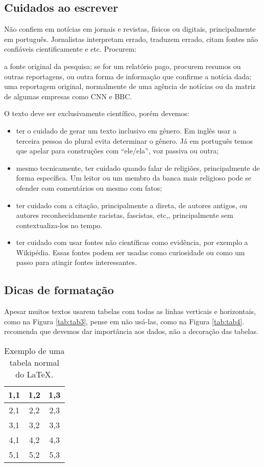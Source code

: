 \documentclass{article}
\begin{document}
\begin{outline}
\subsection{Cuidados ao escrever}

Não confiem em notícias em jornais e revistas, físicos ou digitais, principalmente em português. Jornalistas interpretam errado, traduzem errado, citam fontes não confiáveis cientificamente e etc.
Procurem:
\begin{outline}
    \1 a fonte original da pesquisa;
    \2 se for um relatório pago, procurem resumos ou outras reportagens, ou outra forma de informação que confirme a notícia dada;
    \1 uma reportagem original, normalmente de uma agência de notícias ou da matriz de algumas empresas como CNN e BBC.
\end{outline}

O texto deve ser exclusivamente científico, porém devemos:
\begin{itemize}
    \item ter o cuidado de gerar um texto inclusivo em gênero. Em inglês usar a terceira pessoa do plural evita determinar o gênero. Já em português temos que apelar para construções com ``ele/ela'', voz passiva ou outra;
    \item mesmo tecnicamente, ter cuidado quando falar de religiões, principalmente de forma específica. Um leitor ou um membro da banca mais religioso pode se ofender com comentários ou mesmo com fatos;
    \item ter cuidado com a citação, principalmente a direta, de autores antigos, ou autores reconhecidamente racistas, fascistas, etc,, principalmente sem contextualiza-los no tempo.
    \item ter cuidado com usar fontes não científicas como evidência, por exemplo a Wikipédia. Essas fontes podem ser usadas como curiosidade ou como um passo para atingir fontes interessantes. 
\end{itemize}


\subsection{Dicas de formatação}

Apesar muitos textos usarem tabelas com todas as linhas verticais e horizontais, como na Figura \ref{tab:tab3}, pense em não usá-las, como na Figura \ref{tab:tab4}. \citeauthor{ei} recomenda que devemos dar importância aos dados, não a decoração das tabelas.


\begin{table}[htb]
    \centering
        \caption{Exemplo de uma tabela normal do \LaTeX .}
    \begin{tabular}{|c|c|c|}
    \hline
        1,1 & 1,2 & 1,3   \\
        \hline
        2,1 & 2,2 & 2,3\\
        \hline
        3,1 & 3,2 & 3,3\\
        \hline
        4,1 & 4,2 & 4,3\\
        \hline
        5,1 & 5,2 & 5,3\\
        \hline
    \end{tabular}


\end{table}
\end{outline}
\end{document}
